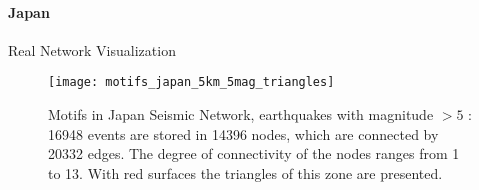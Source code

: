 \clearpage
\paragraph{Japan} Real Network Visualization 

\begin{figure}[!h]
  \centering
  \texttt{[image: motifs\_japan\_5km\_5mag\_triangles]}
  \caption{Motifs in Japan Seismic Network, earthquakes with magnitude $>5$ : 16948 events are stored in 14396 nodes, which are connected by 20332 edges. The degree of connectivity of the nodes ranges from 1 to 13. With red surfaces the triangles of this zone are presented.}
  \label{fig:motifJapan}
\end{figure}
